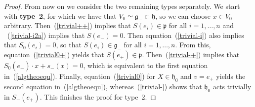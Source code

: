 \documentclass[11pt,a4paper]{amsart}
\DeclareMathOperator{\Id}{Id}
\newcommand{\p}{\mathfrak{p}}
\newcommand{\g}{\mathfrak{g}}
\newcommand{\h}{\mathfrak{h}}
\newcommand{\+}{\oplus}
\newcommand{\so}{\mathfrak{so}}
\newcommand{\1}{\mathbf{1}}
\newcommand{\<}{\langle}
\renewcommand{\>}{\rangle}
\theoremstyle{definition}
\theoremstyle{plain}
\numberwithin{equation}{section}
\begin{document}
\begin{proof}
From now on we consider the two remaining types separately. We start with {\bf type~2}, for which we have that $V_0\simeq \g_-\subset \h$, so we can choose $x\in V_0$ arbitrary. Then~(\ref{trivial++}) implies that $S(e_i)\in \p$ for all $i=1, \ldots ,n $ and ~(\ref{trivial-i2a}) implies that $S(e_-)=0$.
%
%
Then equation~(\ref{trivial-i}) also implies that $S_0(e_i)=0$, so that
$S(e_i)\in \g_-$  for all $i=1, \ldots, n$.
From this, equation~(\ref{trivial0+}) yields that 
 $S(e_+)\in \p$.
Then~(\ref{trivial-+}) implies that  $S_0(e_+)\cdot x+s_-(x)=0$, which is equivalent to the first equation in~(\ref{algtheoequ}).
 Finally, equation~(\ref{trivial0}) for 
 $X\in \h_0$ and $v=e_+$  yields the second equation in~(\ref{algtheoequ}), whereas~(\ref{trivial-}) shows that $\h_0$ acts trivially in $S_-(e_+)$. This finishes the proof for type~2.
 

\end{proof}
\end{document}
